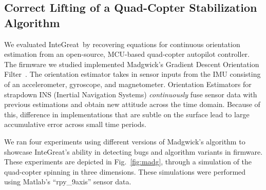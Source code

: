 \subsection{Correct Lifting of a Quad-Copter Stabilization Algorithm}

We evaluated InteGreat\ by recovering equations for continuous orientation estimation from an open-source, MCU-based quad-copter autopilot controller.
The firmware we studied implemented Madgwick's Gradient Descent Orientation Filter~\cite{madgwick}.
The orientation estimator takes in sensor inputs from the IMU consisting of an accelerometer, gyroscope, and magnetometer.
Orientation Estimators for strapdown INS (Inertial Navigation Systems) \emph{continuously} fuse sensor data with previous estimations and obtain new attitude across the time domain.
Because of this, difference in implementations that are subtle on the surface lead to large accumulative error across small time periods.

We ran four experiments using different versions of Madgwick's algorithm to showcase InteGreat's ability in detecting bugs and algorithm variants in firmware.
These experiments are depicted in Fig.~\ref{fig:madg}, through a simulation of the quad-copter spinning in three dimensions.
These simulations were performed using Matlab's ``rpy\_9axis'' sensor data.

